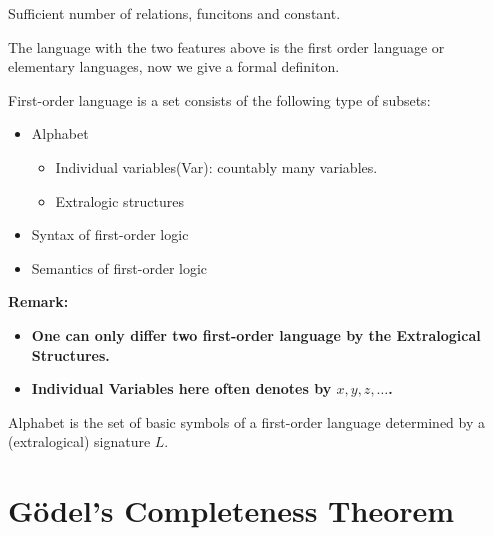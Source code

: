 \documentclass[11pt]{article}
\begin{document}
\begin{definition}
Sufficient number of relations, funcitons and constant.
\end{definition}

The language with the two features above is the first order language or elementary languages, now we give a formal definiton.

\begin{definition}
First-order language is a set consists of the following type of subsets:
\begin{itemize}
\item Alphabet
\begin{itemize}
\item Individual variables(Var): countably many variables.
\item Extralogic structures
\end{itemize}
\item Syntax of first-order logic
\item Semantics of first-order logic
\end{itemize}
\end{definition}

\textbf{Remark:}
\begin{itemize}
\item \textbf{One can only differ two first-order language by the Extralogical Structures.}
\item \textbf{Individual Variables here often denotes by \(x,y,z,\dots\).}
\end{itemize}

\begin{definition}[Alphabet]
Alphabet is the set of basic symbols of a first-order language determined by a (extralogical) signature \(L\).
\end{definition}
\section{Gödel's Completeness Theorem}
\label{sec:org78074cd}
\end{document}
